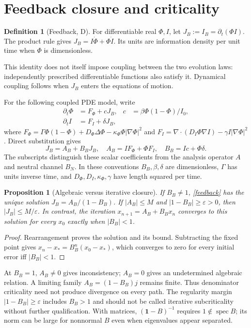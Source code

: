 \documentclass[11pt,letterpaper]{article}
\newcommand{\spec}{\operatorname{spec}}
\newcommand{\Id}{\mathbf 1}
\newtheorem{proposition}[theorem]{Proposition}
\theoremstyle{definition}
\newtheorem{definition}[theorem]{Definition}
\numberwithin{equation}{section}
\begin{document}
\section{Feedback closure and criticality}
\begin{definition}[Feedback, D]
For differentiable real $\Phi,I$, let $J_B:=I_B=\partial_t(\Phi I)$. The product rule gives $J_B=I\dot\Phi+\Phi\dot I$. Its units are information density per unit time when $\Phi$ is dimensionless.
\end{definition}
This identity does not itself impose coupling between the two evolution laws: independently prescribed differentiable functions also satisfy it. Dynamical coupling follows when $J_B$ enters the equations of motion.

For the following coupled PDE model, write
\begin{align}
\partial_t\Phi&=F_\Phi+cJ_B,&c&=\beta\Phi(1-\Phi)/I_0,\\
\partial_t I&=F_I+\delta J_B,
\end{align}
where $F_\Phi=\Gamma\Phi(1-\Phi)+D_\Phi\Delta\Phi-\kappa_\Phi\Phi|\nabla\Phi|^2$ and $F_I=\nabla\cdot(D_I\Phi\nabla I)-\gamma I|\nabla\Phi|^2$. Direct substitution gives
\begin{equation}\label{feedback}
J_B=A_B+B_BJ_B,\quad A_B=IF_\Phi+\Phi F_I,\quad B_B=Ic+\Phi\delta.
\end{equation}
The subscripts distinguish these scalar coefficients from the analysis operator $A$ and neutral channel $B_N$. In these conventions $B_B,\beta,\delta$ are dimensionless, $\Gamma$ has units inverse time, and $D_\Phi,D_I,\kappa_\Phi,\gamma$ have length squared per time.

\begin{proposition}[Algebraic versus iterative closure]\label{feedbackprop}
If $B_B\ne1$, \eqref{feedback} has the unique solution $J_B=A_B/(1-B_B)$. If $|A_B|\leq M$ and $|1-B_B|\geq\varepsilon>0$, then $|J_B|\leq M/\varepsilon$. In contrast, the iteration $x_{n+1}=A_B+B_Bx_n$ converges to this solution for every $x_0$ exactly when $|B_B|<1$.
\end{proposition}
\begin{proof}
Rearrangement proves the solution and its bound. Subtracting the fixed point gives $x_n-x_*=B_B^n(x_0-x_*)$, which converges to zero for every initial error iff $|B_B|<1$.
\end{proof}
At $B_B=1$, $A_B\ne0$ gives inconsistency; $A_B=0$ gives an undetermined algebraic relation. A limiting family $A_B=(1-B_B)j$ remains finite. Thus denominator criticality need not produce divergence on every path. The regularity margin $|1-B_B|\geq\varepsilon$ includes $B_B>1$ and should not be called iterative subcriticality without further qualification. With matrices, $(\Id-B)^{-1}$ requires $1\notin\spec B$; its norm can be large for nonnormal $B$ even when eigenvalues appear separated.
\end{document}
